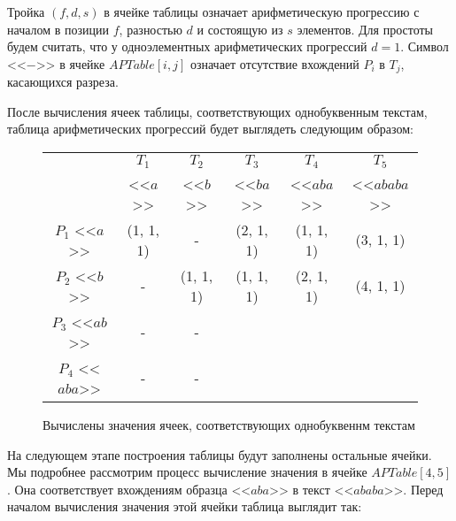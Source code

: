 \documentclass[14pt]{article}
\begin{document}
Тройка $(f, d, s)$ в ячейке таблицы означает арифметическую прогрессию с началом в
позиции $f$, разностью $d$ и состоящую из $s$ элементов.
Для простоты будем считать, что у одноэлементных арифметических прогрессий $d = 1$.
Символ <<$-$>> в ячейке $APTable[i, j]$ означает отсутствие вхождений $P_i$ в $T_j$, касающихся разреза. 

После вычисления ячеек таблицы, соответствующих однобуквенным текстам, таблица арифметических прогрессий будет выглядеть следующим образом:

\begin{figure}[H]
    \begin{center}
        \begin{tabular}{ | c | c | c | c | c | c |}

        \hline
              & $T_1$ & $T_2$ & $T_3$ & $T_4$ & $T_5$ \\
              & <<$a$>> & <<$b$>> & <<$ba$>> & <<$aba$>> & <<$ababa$>> \\      
        \hline
        $P_1$ <<$a$>> & (1, 1, 1) & - & (2, 1, 1) & (1, 1, 1) & (3, 1, 1) \\
        \hline
        $P_2$ <<$b$>> & - & (1, 1, 1) & (1, 1, 1) & (2, 1, 1) & (4, 1, 1) \\
        \hline
        $P_3$ <<$ab$>> & - & - & & &\\
        \hline
        $P_4$ <<$aba$>> & - & - & & &\\
        \hline
        \end{tabular}
    \end{center}
    \caption{Вычислены значения ячеек, соответствующих однобуквеннм текстам}
    \label{ex1}
\end{figure}

На следующем этапе построения таблицы будут заполнены остальные ячейки.
Мы подробнее рассмотрим процесс вычисление значения в ячейке $APTable[4, 5]$. Она соответствует вхождениям образца
<<$aba$>> в текст <<$ababa$>>.
Перед началом вычисления значения этой ячейки таблица выглядит так:
\end{document}
